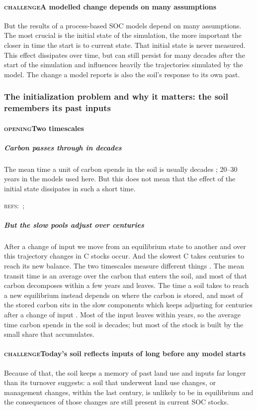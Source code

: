 \documentclass[11pt]{article}
\newcommand{\beat}[1]{\textcolor{black!45}{\textsc{\small #1}}\enspace}
\newcommand{\refs}[1]{\par\textcolor{red!70!black}{\footnotesize\textsc{refs:}\ #1}\par}
\begin{document}
\paragraph{\beat{challenge}A modelled change depends on many assumptions}
But the results of a process-based SOC models depend on many assumptions. The most crucial is the initial state of the simulation, the more important the closer in time the start is to current state.  That initial state is never measured. This effect dissipates over time, but can still persist for many decades after the start of the simulation and influences heavily the trajectories simulated by the model.
The change a model reports is also the soil's response to its own past.

\subsubsection{The initialization problem and why it matters: the soil remembers its past inputs}
\paragraph{\beat{opening}Two timescales}
\subparagraph{Carbon passes through in decades}
The mean time a unit of carbon spends in the soil is usually decades
\citep{Sierra2017, Sierra2018}; 20--30 years in the models used here. But this does not mean
that the effect of the initial state dissipates in such a short time.
\refs{\citet{Sierra2017}; \citet{Sierra2018}}
\subparagraph{But the slow pools adjust over centuries}
After a change of input we move from an equilibrium state to another and over this trajectory changes in C stocks occur.
And the slowest C takes centuries to reach its new balance. The two timescales measure different things \citep{Sierra2018}. The mean transit time is an average over the carbon that enters the soil, and most of that carbon decomposes within a few years and leaves. The time a soil takes to reach a new equilibrium instead depends on where the carbon is stored, and most of the stored carbon sits in the slow components which keeps adjusting for centuries after a change of input \citep{Wutzler2007}. Most of the input leaves within years, so the average time carbon spends in the soil is decades; but most of the stock is built by the small share that accumulates.

\paragraph{\beat{challenge}Today's soil reflects inputs of long before any model starts}
Because of that, the soil keeps a memory of past land use and inputs far longer than its turnover
suggests: a soil that underwent land use changes, or management changes, within the last century, is unlikely to be in equilibrium and the consequences of those changes are still present in current SOC stocks.
\end{document}
